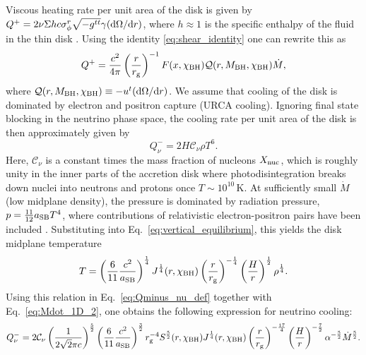Viscous heating rate per unit area of the disk is given by $Q^+ = 2\nu\Sigma h c \sigma^r_\phi \sqrt{-g^{tt}}\gamma ({\rm d}\Omega/{\rm d}r)$, where $h\approx 1$ is the specific enthalpy of the fluid in the thin disk \cite{beloborodov_super-eddington_1998}. Using the identity \eqref{eq:shear_identity} one can rewrite this as
\begin{equation}
	Q^+ = \frac{c^2}{4\pi}\left(\frac{r}{r_{\rm g}}\right)^{-1} F(x,\chi_{\rm BH}) \mathcal{Q}(r,M_{\rm BH},\chi_{\rm BH}) \dot{M}, \label{eq:Qplus}
\end{equation}
where $\mathcal{Q}(r,M_{\rm BH},\chi_{\rm BH})\equiv -u^t ({\rm d}\Omega/{\rm d}r)$. We assume that cooling of the disk is dominated by electron and positron capture (URCA cooling). Ignoring final state blocking in the neutrino phase space, the cooling rate per unit area of the disk is then approximately given by \cite{tubbs_neutrino_1975,bruenn_stellar_1985,qian_nucleosynthesis_1996,popham_hyperaccreting_1999}
\begin{equation}
	Q^-_\nu = 2H \mathcal{C}_\nu \rho T^6. \label{eq:Qminus_nu_def}
\end{equation}
Here, $\mathcal{C}_\nu$ is a constant times the mass fraction of nucleons $X_{\rm nuc}$, which is roughly unity in the inner parts of the accretion disk where photodisintegration breaks down nuclei into neutrons and protons once $T\sim 10^{10}$\,K. At sufficiently small $\dot{M}$ (low midplane density), the pressure is dominated by radiation pressure, $p = \frac{11}{12}a_{\rm SB} T^4$, where contributions of relativistic electron-positron pairs have been included \cite{popham_hyperaccreting_1999}. Substituting into Eq.~\eqref{eq:vertical_equilibrium}, this yields the disk midplane temperature
\begin{equation}
	T = \left(\frac{6}{11}\frac{c^2}{a_{\rm SB}}\right)^{\frac{1}{4}} J^{\frac{1}{4}}(r,\chi_{\rm BH}) \left(\frac{r}{r_{\rm g}}\right)^{-\frac{1}{4}} \left(\frac{H}{r}\right)^{\frac{1}{2}} \rho^{\frac{1}{4}}. \label{eq:T_1D}
\end{equation}
Using this relation in Eq.~\eqref{eq:Qminus_nu_def} together with Eq.~\eqref{eq:Mdot_1D_2}, one obtains the following expression for neutrino cooling:
\begin{equation}
	Q^-_\nu = 2 \mathcal{C}_\nu \left(\frac{1}{2\sqrt{2}\pi c}\right)^{\frac{5}{2}} \left(\frac{6}{11}\frac{c^2}{a_{\rm SB}}\right)^{\frac{3}{2}} r_{\rm g}^{-4} S^{\frac{5}{2}}(r,\chi_{\rm BH}) J^{\frac{1}{4}}(r,\chi_{\rm BH}) \left(\frac{r}{r_{\rm g}}\right)^{-\frac{17}{4}}\left(\frac{H}{r}\right)^{-\frac{7}{2}} \alpha^{-\frac{5}{2}}\dot{M}^{\frac{5}{2}}. \label{eq:Qminus_nu}
\end{equation}

